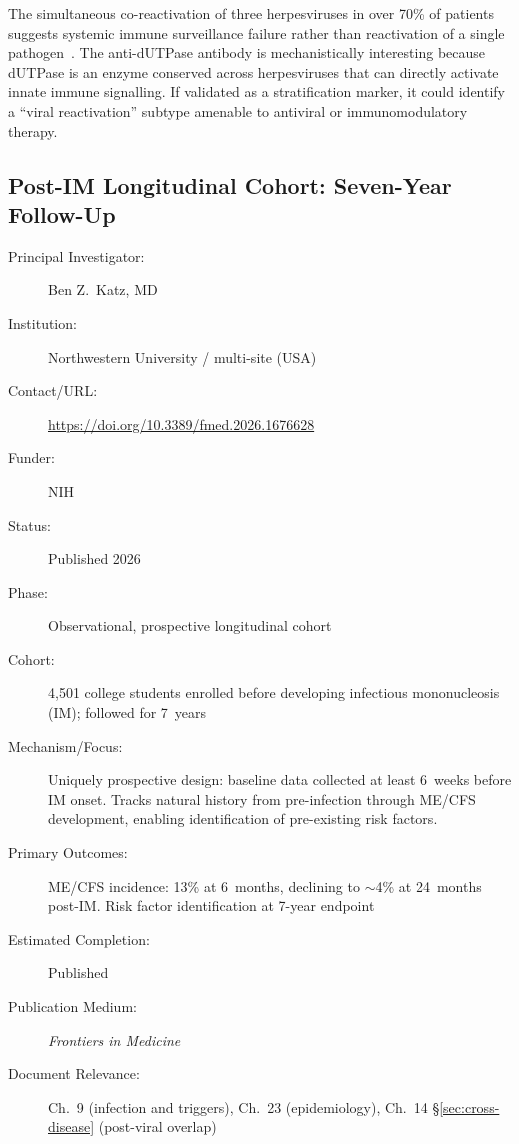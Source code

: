 The simultaneous co-reactivation of three herpesviruses in over 70\% of
patients suggests systemic immune surveillance failure rather than
reactivation of a single pathogen~\cite{Palomo2026herpesvirus}.  The
anti-dUTPase antibody is mechanistically interesting because dUTPase is an
enzyme conserved across herpesviruses that can directly activate innate
immune signalling.  If validated as a stratification marker, it could
identify a ``viral reactivation'' subtype amenable to antiviral or
immunomodulatory therapy.

\subsection{Post-IM Longitudinal Cohort: Seven-Year Follow-Up}
\label{sec:registry-post-im-cohort}

\begin{description}
    \item[Principal Investigator:] Ben Z.\ Katz, MD
    \item[Institution:] Northwestern University / multi-site (USA)
    \item[Contact/URL:] \url{https://doi.org/10.3389/fmed.2026.1676628}
    \item[Funder:] NIH
    \item[Status:] Published 2026
    \item[Phase:] Observational, prospective longitudinal cohort
    \item[Cohort:] 4,501 college students enrolled before developing
        infectious mononucleosis (IM); followed for 7~years
    \item[Mechanism/Focus:] Uniquely prospective design: baseline data
        collected at least 6~weeks before IM onset.  Tracks natural history
        from pre-infection through ME/CFS development, enabling
        identification of pre-existing risk factors.
    \item[Primary Outcomes:] ME/CFS incidence: 13\% at 6~months, declining to
        $\sim$4\% at 24~months post-IM.  Risk factor identification at 7-year
        endpoint
    \item[Estimated Completion:] Published
    \item[Publication Medium:] \textit{Frontiers in Medicine}
    \item[Document Relevance:] Ch.~9 (infection and triggers), Ch.~23
        (epidemiology), Ch.~14 \S\ref{sec:cross-disease} (post-viral overlap)
\end{description}

